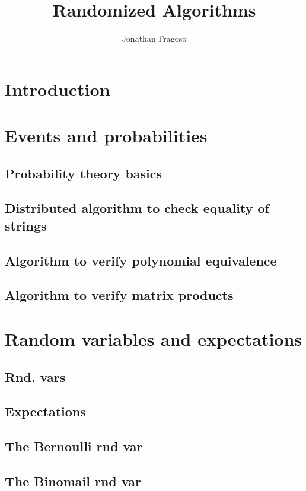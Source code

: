 \documentclass{book}
\title{Randomized Algorithms}
\author{Jonathan Fragoso}
\begin{document}
\maketitle

%

\tableofcontents

\chapter{Introduction}

\chapter{Events and probabilities}
\section{Probability theory basics}
\section{Distributed algorithm to check equality of strings}
\section{Algorithm to verify polynomial equivalence}
\section{Algorithm to verify matrix products}

\chapter{Random variables and expectations}
\section{Rnd. vars}
\section{Expectations}
\section{The Bernoulli rnd var}
\section{The Binomail rnd var}
\end{document}
